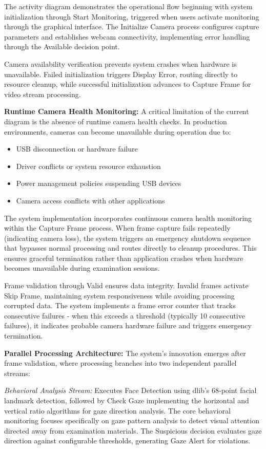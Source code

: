 \documentclass[conference]{IEEEtran}
\begin{document}
The activity diagram demonstrates the operational flow beginning with system 
initialization through Start Monitoring, triggered when users activate monitoring 
through the graphical interface. The Initialize Camera process configures capture 
parameters and establishes webcam connectivity, implementing error handling through 
the Available decision point.

Camera availability verification prevents system crashes 
when hardware is unavailable. Failed initialization triggers Display Error, 
routing directly to resource cleanup, while successful initialization advances to 
Capture Frame for video stream processing.

\textbf{Runtime Camera Health Monitoring:} A critical limitation of the current 
diagram is the absence of runtime camera health checks. In production environments, 
cameras can become unavailable during operation due to:
\begin{itemize}
    \item USB disconnection or hardware failure
    \item Driver conflicts or system resource exhaustion  
    \item Power management policies suspending USB devices
    \item Camera access conflicts with other applications
\end{itemize}

The system implementation incorporates continuous camera health monitoring within 
the Capture Frame process. When frame capture fails repeatedly (indicating camera 
loss), the system triggers an emergency shutdown sequence that bypasses normal 
processing and routes directly to cleanup procedures. This ensures graceful 
termination rather than application crashes when hardware becomes unavailable 
during examination sessions.

Frame validation through Valid ensures data integrity. Invalid frames 
activate Skip Frame, maintaining system responsiveness while avoiding processing 
corrupted data. The system implements a frame error counter that tracks consecutive 
failures - when this exceeds a threshold (typically 10 consecutive failures), 
it indicates probable camera hardware failure and triggers emergency termination.

\textbf{Parallel Processing Architecture:} The system's innovation emerges after 
frame validation, where processing branches into two independent parallel streams:

\textit{Behavioral Analysis Stream:} Executes Face Detection using dlib's 68-point 
facial landmark detection, followed by Check Gaze implementing the horizontal 
and vertical ratio algorithms for gaze direction analysis. The core behavioral monitoring 
focuses specifically on gaze pattern analysis to detect visual attention directed away 
from examination materials. The Suspicious decision evaluates gaze direction 
against configurable thresholds, generating Gaze Alert for violations.
\end{document}
